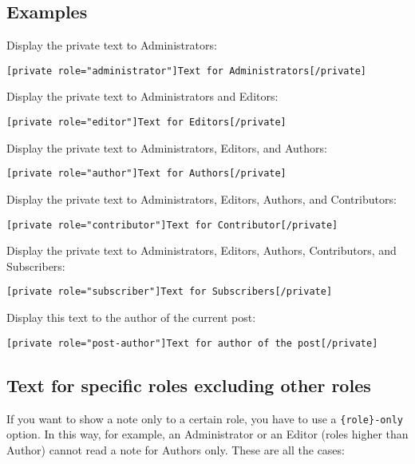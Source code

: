 \subsection{Examples}

Display the private text to Administrators:

\begin{lstlisting}
[private role="administrator"]Text for Administrators[/private]
\end{lstlisting}

Display the private text to Administrators and Editors:

\begin{lstlisting}
[private role="editor"]Text for Editors[/private]
\end{lstlisting}

Display the private text to Administrators, Editors, and Authors:

\begin{lstlisting}
[private role="author"]Text for Authors[/private]
\end{lstlisting}

Display the private text to Administrators, Editors, Authors, and Contributors:

\begin{lstlisting}
[private role="contributor"]Text for Contributor[/private]
\end{lstlisting}

Display the private text to Administrators, Editors, Authors, Contributors, and
Subscribers:

\begin{lstlisting}
[private role="subscriber"]Text for Subscribers[/private]
\end{lstlisting}

Display this text to the author of the current post:

\begin{lstlisting}
[private role="post-author"]Text for author of the post[/private]
\end{lstlisting}

\subsection{Text for specific roles excluding other roles}

If you want to show a note only to a certain role, you have to use a
\verb+{role}-only+ option. In this way, for example, an Administrator or an
Editor (roles higher than Author) cannot read a note for Authors only. These are
all the cases:

